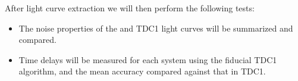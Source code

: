 After light curve extraction we will then perform the following tests:
\begin{itemize}
\item The noise properties of the \TwinklesOne and TDC1 light curves
will be summarized and compared.
\item Time delays will be measured for each system using the fiducial
TDC1 algorithm, and the mean accuracy compared against that in TDC1.
\end{itemize}


